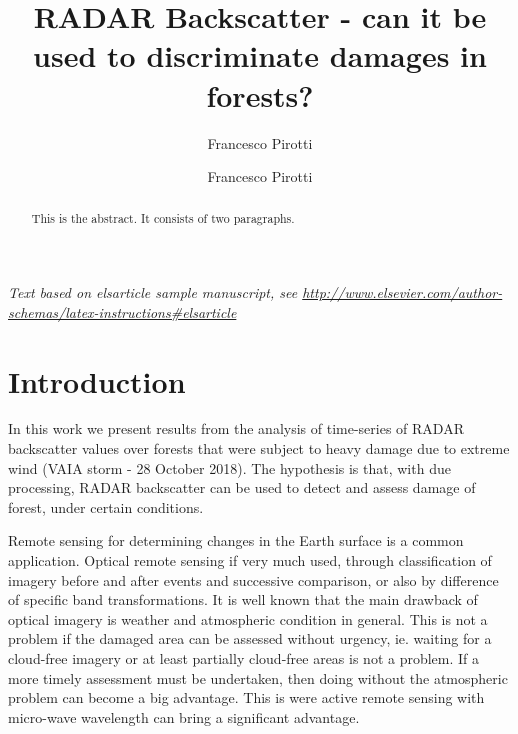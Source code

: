 \documentclass[]{elsarticle} %
\begin{document}
\begin{frontmatter}

  \title{RADAR Backscatter - can it be used to discriminate damages in forests?}
    \author[CIRGEO Interdepartmental Research Center of Research of Geomatics]{Francesco Pirotti}
    \author[TESAF Department]{Francesco Pirotti}
      \address[CIRGEO Interdepartmental Research Center of Research of Geomatics]{Agripolis, University of Padova, Legnaro 35020, Italy}
    \address[TESAF Department]{University of Padova, Legnaro 35020, Italy}
  
  \begin{abstract}
  This is the abstract. It consists of two paragraphs.
  \end{abstract}
  
 \end{frontmatter}

\emph{Text based on elsarticle sample manuscript, see
\url{http://www.elsevier.com/author-schemas/latex-instructions\#elsarticle}}

\hypertarget{introduction}{%
\section{Introduction}\label{introduction}}

In this work we present results from the analysis of time-series of
RADAR backscatter values over forests that were subject to heavy damage
due to extreme wind (VAIA storm - 28 October 2018). The hypothesis is
that, with due processing, RADAR backscatter can be used to detect and
assess damage of forest, under certain conditions.

Remote sensing for determining changes in the Earth surface is a common
application. Optical remote sensing if very much used, through
classification of imagery before and after events and successive
comparison, or also by difference of specific band transformations. It
is well known that the main drawback of optical imagery is weather and
atmospheric condition in general. This is not a problem if the damaged
area can be assessed without urgency, ie. waiting for a cloud-free
imagery or at least partially cloud-free areas is not a problem. If a
more timely assessment must be undertaken, then doing without the
atmospheric problem can become a big advantage. This is were active
remote sensing with micro-wave wavelength can bring a significant
advantage.
\end{document}

